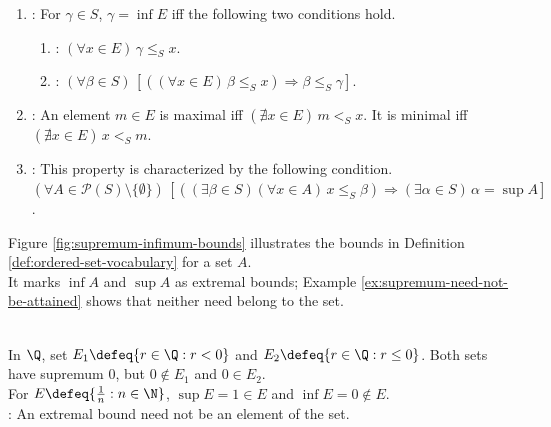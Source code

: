 \begin{definition}
\begin{enumerate}[label=(\roman*)]
\begin{enumerate}[label=\arabic*.]
\end{enumerate}
\item {}: For $\gamma\in S$, $\gamma=\inf E$ iff the following two conditions hold.
\begin{enumerate}[label=\arabic*.]
\setlength{\itemsep}{0pt}
\item {}: $(\forall x\in E)\,\gamma\leq_Sx$.
\item {}: $(\forall \beta\in S)\,[((\forall x\in E)\,\beta\leq_Sx)\Rightarrow\beta\leq_S\gamma]$.
\end{enumerate}
\item {}: An element $m\in E$ is maximal iff $(\nexists x\in E)\,m<_Sx$. It is minimal iff $(\nexists x\in E)\,x<_Sm$.
\item {}: This property is characterized by the following condition.\\
$(\forall A\in\mathcal{P}(S)\setminus\{\emptyset\})\,[((\exists \beta\in S)(\forall x\in A)\,x\leq_S\beta)\Rightarrow(\exists \alpha\in S)\,\alpha=\sup A]$.
\end{enumerate}
\end{definition}

\begin{illustrationfigure}[H]
  \centering
  
  \caption{The supremum is the least upper bound, while the infimum is the greatest lower bound.}
  \label{fig:supremum-infimum-bounds}
\end{illustrationfigure}

Figure \ref{fig:supremum-infimum-bounds} illustrates the bounds in Definition \ref{def:ordered-set-vocabulary} for a set $A$.\\
It marks $\inf A$ and $\sup A$ as extremal bounds; Example \ref{ex:supremum-need-not-be-attained} shows that neither need belong to the set.

\begin{example} \label{ex:supremum-need-not-be-attained} \\
In $\Q$, set $E_1\defeq\{r\in\Q:r<0\}$ and $E_2\defeq\{r\in\Q:r\leq0\}$. Both sets have supremum $0$, but $0\notin E_1$ and $0\in E_2$.\\
For $E\defeq\{\frac{1}{n}:n\in\N\}$, $\sup E=1\in E$ and $\inf E=0\notin E$.\\
: An extremal bound need not be an element of the set.
\end{example}

